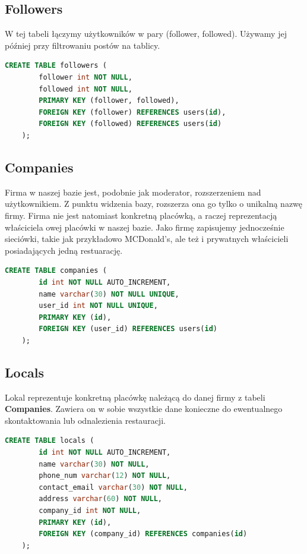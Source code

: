 \documentclass{report}
\begin{document}
\subsection*{Followers}
W tej tabeli łączymy użytkowników w pary (follower, followed).
Używamy jej później przy filtrowaniu postów na tablicy.
\begin{lstlisting}[language=SQL]
    CREATE TABLE followers (
        follower int NOT NULL, 
        followed int NOT NULL, 
        PRIMARY KEY (follower, followed),
        FOREIGN KEY (follower) REFERENCES users(id),
        FOREIGN KEY (followed) REFERENCES users(id)
    );
\end{lstlisting}


\subsection*{Companies}
Firma w naszej bazie jest, podobnie jak moderator, rozszerzeniem
nad użytkownikiem. Z punktu widzenia bazy, rozszerza ona go tylko o
unikalną nazwę firmy. Firma nie jest natomiast konkretną placówką,
a raczej reprezentacją właściciela owej placówki w naszej bazie.
Jako firmę zapisujemy jednocześnie sieciówki, takie jak przykładowo
MCDonald's, ale też i prywatnych właścicieli posiadających jedną
restuarację.
\begin{lstlisting}[language=SQL]
    CREATE TABLE companies ( 
        id int NOT NULL AUTO_INCREMENT,
        name varchar(30) NOT NULL UNIQUE,
        user_id int NOT NULL UNIQUE,
        PRIMARY KEY (id),
        FOREIGN KEY (user_id) REFERENCES users(id)
    );
\end{lstlisting}

\subsection*{Locals}
Lokal reprezentuje konkretną placówkę należącą do danej firmy
z tabeli \textbf{Companies}. Zawiera on w sobie wszystkie dane konieczne
do ewentualnego skontaktowania lub odnalezienia restauracji.
\begin{lstlisting}[language=SQL]
    CREATE TABLE locals (
        id int NOT NULL AUTO_INCREMENT,
        name varchar(30) NOT NULL,
        phone_num varchar(12) NOT NULL,
        contact_email varchar(30) NOT NULL,
        address varchar(60) NOT NULL,
        company_id int NOT NULL,
        PRIMARY KEY (id),
        FOREIGN KEY (company_id) REFERENCES companies(id)
    );
\end{lstlisting}
\end{document}
